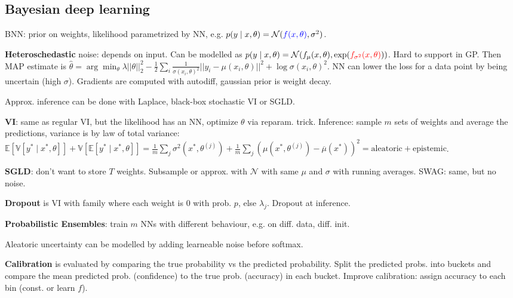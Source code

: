 \documentclass[11pt,landscape,a4paper,fleqn]{article}
\begin{document}
\begin{multicols*}{4}
\section{Bayesian deep learning}

BNN: prior on weights, likelihood parametrized by NN, e.g. \(p(y \mid x, \theta) = \mathcal{N}(\textcolor{blue}{f(x, \theta)}, \sigma^2)\).

\textbf{Heteroschedastic} noise: depends on input. Can be modelled as \(p(y \mid x, \theta) = \mathcal{N}(f_\mu(x, \theta), \exp(\textcolor{red}{f_{\sigma^2}(x, \theta)}))\). Hard to support in GP.
Then MAP estimate is \(\hat{\theta} = \arg\min_\theta \lambda ||\theta||_2^2 - \frac{1}{2} \sum_i \frac{1}{\sigma(x_i, \theta)^2} ||y_i - \mu(x_i, \theta)||^2 + \log \sigma(x_i, \theta)^2\).
NN can lower the loss for a data point by being uncertain (high \(\sigma\)).
Gradients are computed with autodiff, gaussian prior is weight decay.

Approx. inference can be done with Laplace, black-box stochastic VI or SGLD.

\textbf{VI}: same as regular VI, but the likelihood has an NN, optimize \(\theta\) via reparam. trick.
Inference: sample \(m\) sets of weights and average the predictions, variance is by law of total variance:
\(\mathbb{E}[\mathbb{V}[y^* \mid x^*, \theta]] + \mathbb{V}[\mathbb{E}[y^* \mid x^*, \theta]] =
\frac{1}{m} \sum_j \sigma^2(x^*, \theta^{(j)}) + \frac{1}{m} \sum_j (\mu(x^*, \theta^{(j)}) - \overline{\mu}(x^*))^2 = \mathrm{aleatoric} + \mathrm{epistemic}\).

\textbf{SGLD}: don't want to store \(T\) weights. Subsample or approx. with \(\mathcal{N}\) with same \(\mu\) and \(\sigma\) with running averages. SWAG: same, but no noise.

\textbf{Dropout} is VI with family where each weight is \(0\) with prob. \(p\), else \(\lambda_j\).
Dropout at inference.

\textbf{Probabilistic Ensembles}: train \(m\) NNs with different behaviour, e.g. on diff. data, diff. init.

Aleatoric uncertainty can be modelled by adding learneable noise before softmax.

\textbf{Calibration} is evaluated by comparing the true probability vs the predicted probability.
Split the predicted probs. into buckets and compare the mean predicted prob. (confidence) to the true prob. (accuracy) in each bucket.
Improve calibration: assign accuracy to each bin (const. or learn \(f\)).


\end{multicols*}
\end{document}
